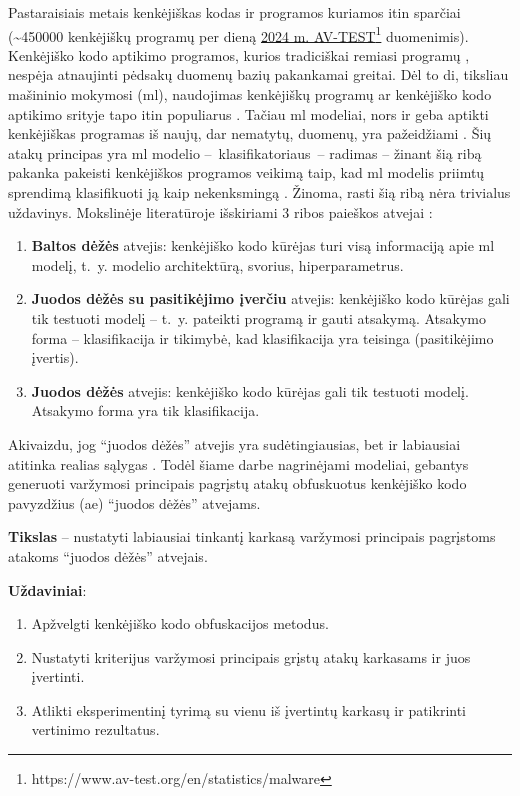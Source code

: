 
Pastaraisiais metais kenkėjiškas kodas ir programos kuriamos itin sparčiai (\sim450000 kenkėjiškų programų per dieną \href{https://www.av-test.org/en/statistics/malware/}{2024 m. AV-TEST}\footnote{https://www.av-test.org/en/statistics/malware} duomenimis). Kenkėjiško kodo aptikimo programos, kurios tradiciškai remiasi programų , nespėja atnaujinti pėdsakų duomenų bazių pakankamai greitai. Dėl to \gls{di}, tiksliau mašininio mokymosi (\gls{ml}), naudojimas kenkėjiškų programų ar kenkėjiško kodo aptikimo srityje tapo itin populiarus \cite{demetrioAdversarialEXEmplesSurvey2021}. Tačiau \gls{ml} modeliai, nors ir geba aptikti kenkėjiškas programas iš naujų, dar nematytų, duomenų, yra pažeidžiami  \cite{castroAIMEDEvolvingMalware2019,huGeneratingAdversarialMalware2017,rosenbergGenericBlackBoxEndEnd2018,zhongReinforcementLearningBased2022}. Šių atakų principas yra \gls{ml} modelio --~klasifikatoriaus~--  radimas -- žinant šią ribą pakanka pakeisti kenkėjiškos programos veikimą taip, kad \gls{ml} modelis priimtų sprendimą klasifikuoti ją kaip nekenksmingą \cite{demetrioAdversarialEXEmplesSurvey2021}. Žinoma, rasti šią ribą nėra trivialus uždavinys. Mokslinėje literatūroje išskiriami 3 ribos paieškos atvejai \cite{fangEvadingMalwareEngines2019}:
\begin{enumerate}
    \item \textbf{Baltos dėžės} atvejis: kenkėjiško kodo kūrėjas turi visą informaciją apie \gls{ml} modelį, t.~y. modelio architektūrą, svorius, hiperparametrus.
    \item \textbf{Juodos dėžės su pasitikėjimo įverčiu} atvejis: kenkėjiško kodo kūrėjas gali tik testuoti modelį -- t.~y. pateikti programą ir gauti atsakymą. Atsakymo forma -- klasifikacija ir tikimybė, kad klasifikacija yra teisinga (pasitikėjimo įvertis).
    \item \textbf{Juodos dėžės} atvejis: kenkėjiško kodo kūrėjas gali tik testuoti modelį. Atsakymo forma yra tik klasifikacija.
\end{enumerate}
Akivaizdu, jog \enquote{juodos dėžės} atvejis yra sudėtingiausias, bet ir labiausiai atitinka realias sąlygas \cite{andersonLearningEvadeStatic2018}. Todėl šiame darbe nagrinėjami modeliai, gebantys generuoti varžymosi principais pagrįstų atakų obfuskuotus kenkėjiško kodo pavyzdžius (\gls{ae}) \enquote{juodos dėžės} atvejams.

\vspace{10pt}
\textbf{Tikslas} -- nustatyti labiausiai tinkantį karkasą varžymosi principais pagrįstoms atakoms \enquote{juodos dėžės} atvejais.

\vspace{10pt}
\textbf{Uždaviniai}:
\begin{enumerate}
    \item Apžvelgti kenkėjiško kodo obfuskacijos metodus.
    \item Nustatyti kriterijus varžymosi principais grįstų atakų karkasams ir juos įvertinti.
    \item Atlikti eksperimentinį tyrimą su vienu iš įvertintų karkasų ir patikrinti vertinimo rezultatus.
\end{enumerate}